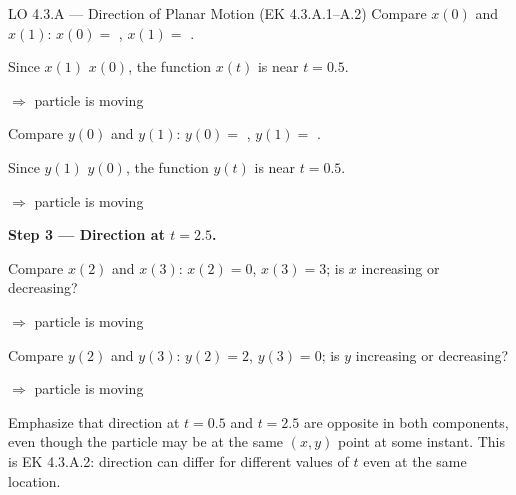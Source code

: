 \documentclass[10pt]{article}
\begin{document}
\begin{notesbox}{LO 4.3.A --- Direction of Planar Motion (EK 4.3.A.1--A.2)}
Compare $x(0)$ and $x(1)$: $x(0) = $ , $x(1) = $ .

Since $x(1)$ \ans{$<$} $x(0)$, the function $x(t)$ is  near $t = 0.5$.

$\Rightarrow$ particle is moving 

Compare $y(0)$ and $y(1)$: $y(0) = $ , $y(1) = $ .

Since $y(1)$ \ans{$>$} $y(0)$, the function $y(t)$ is  near $t = 0.5$.

$\Rightarrow$ particle is moving 

\vspace{8pt}
\textbf{Step 3 --- Direction at $t = 2.5$.}

Compare $x(2)$ and $x(3)$: $x(2) = 0$, $x(3) = 3$; is $x$ increasing or decreasing? 

$\Rightarrow$ particle is moving 

Compare $y(2)$ and $y(3)$: $y(2) = 2$, $y(3) = 0$; is $y$ increasing or decreasing? 

$\Rightarrow$ particle is moving 

\begin{teachernote}
  Emphasize that direction at $t = 0.5$ and $t = 2.5$ are opposite in both components,
  even though the particle may be at the same $(x,y)$ point at some instant. This is
  EK 4.3.A.2: direction can differ for different values of $t$ even at the same location.
\end{teachernote}

\end{notesbox}

\vspace{0.08in}
\end{document}
